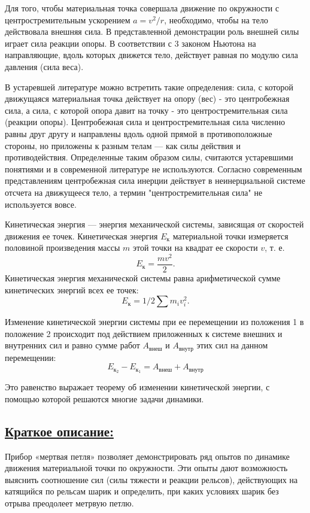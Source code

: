 \documentclass[14pt,a4paper,oneside]{extarticle}	%
\begin{document}
Для того, чтобы материальная точка совершала движение по окружности с центростремительным ускорением $a = v^2/r$, необходимо, чтобы на тело действовала внешняя сила. В представленной демонстрации роль внешней силы играет сила реакции опоры. В соответствии с 3 законом Ньютона на направляющие, вдоль которых движется тело, действует равная по модулю сила давления (сила веса).

В устаревшей литературе можно встретить такие определения: сила, с которой движущаяся материальная точка действует на опору (вес) - это центробежная сила, а сила, с которой опора давит на точку - это центростремительная сила (реакции опоры).
Центробежная сила и центростремительная сила численно равны друг другу и направлены вдоль одной прямой в противоположные стороны, но приложены к разным телам — как силы действия и противодействия.
Определенные таким образом силы, считаются устаревшими понятиями и в современной литературе не используются.
Согласно современным представлениям центробежная сила инерции действует в неинерциальной системе отсчета на движущееся тело, а термин "центростремительная сила" не используется вовсе.

Кинетическая энергия — энергия механической системы, зависящая от скоростей движения ее точек.
Кинетическая энергия $ E_{\text{к}} $ материальной точки измеряется половиной произведения массы $ m $ этой точки на квадрат ее скорости $ v $, т. е. $$ E_{\text{к}}  = \frac{mv^2}{2}. $$ 
Кинетическая энергия механической системы равна арифметической сумме кинетических энергий всех ее точек: 
$$ E_{\text{к}}  = 1/2 \sum  m_i v_i^2.$$ 

Изменение кинетической энергии системы при ее перемещении из положения 1 в положение 2 
происходит под действием приложенных к системе внешних и внутренних сил и равно сумме работ $ A_{\text{внеш}}$ и $ A_{\text{внутр}}$ этих сил на данном перемещении:
$$
E_{\text{к}_{2}} - E_{\text{к}_{1}} = A_{\text{внеш}} + A_{\text{внутр}}
$$
 
Это равенство выражает теорему об изменении кинетической энергии, с помощью которой решаются многие задачи динамики.

\subsection*{\underline{Краткое описание:}}

Прибор «мертвая петля» позволяет демонстрировать ряд опытов по динамике движения материальной точки по окружности.
Эти опыты дают возможность выяснить соотношение сил (силы тяжести и реакции рельсов), действующих на катящийся по рельсам шарик и определить, при каких условиях шарик без отрыва преодолеет метрвую петлю.
\end{document}
